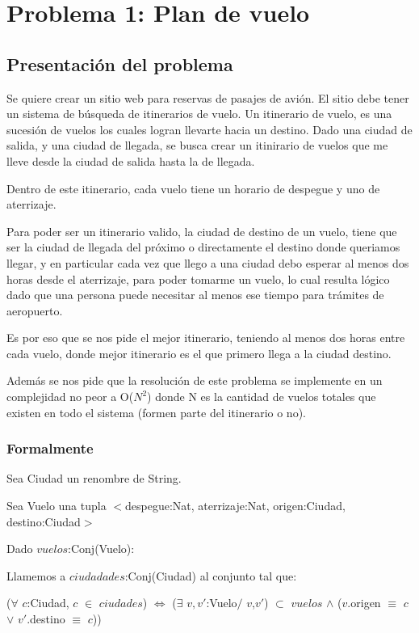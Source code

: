 \section{Problema 1: Plan de vuelo}

\subsection{Presentación del problema}

Se quiere crear un sitio web para reservas de pasajes de avi\'on. El sitio debe tener un sistema de b\'usqueda de itinerarios de vuelo. Un itinerario de vuelo, es una sucesi\'on de vuelos los cuales logran llevarte hacia un destino. Dado una ciudad de salida, y una ciudad de llegada, se busca crear un itinirario de vuelos que me lleve desde la ciudad de salida hasta la de llegada.

Dentro de este itinerario, cada vuelo tiene un horario de despegue y uno de aterrizaje. 

Para poder ser un itinerario valido, la ciudad de destino de un vuelo, tiene que ser la ciudad de llegada del pr\'oximo o directamente el destino donde queriamos llegar, y en particular cada vez que llego a una ciudad debo esperar al menos dos horas desde el aterrizaje, para poder tomarme un vuelo, lo cual resulta l\'ogico dado que una persona puede necesitar al menos ese tiempo para tr\'amites de aeropuerto.

Es por eso que se nos pide el mejor itinerario, teniendo al menos dos horas entre cada vuelo, donde mejor itinerario es el que primero llega a la ciudad destino.

Adem\'as se nos pide que la resoluci\'on de este problema se implemente en un complejidad no peor a O($N^{2}$) donde N es la cantidad de vuelos totales que existen en todo el sistema (formen parte del itinerario o no).

\newpage
\subsubsection{Formalmente}


Sea Ciudad un renombre de String.

Sea Vuelo una tupla $<$despegue:Nat, aterrizaje:Nat, origen:Ciudad, destino:Ciudad$>$

Dado $vuelos$:Conj(Vuelo):

Llamemos a $ciudadades$:Conj(Ciudad) al conjunto tal que:

($\forall$ $c$:Ciudad, $c$ $\in$ $ciudades$)  $\Leftrightarrow$ ($\exists$ $v,v'$:Vuelo$/$ $v$,$v'$) $\subset$ $vuelos$ $\wedge$ ($v$.origen $\equiv$ $c$ $\vee$ $v'$.destino $\equiv$ $c$))

